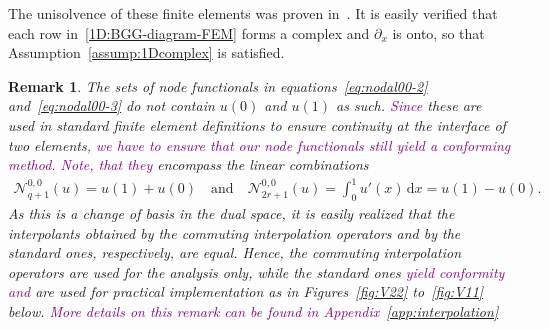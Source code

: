 \documentclass[final]{amsart}%
\newtheorem{remark}{Remark}
\newcommand{\0}{\mathaccent23}
\newcommand\dx{\,\mathrm{d}x}
\newcommand{\nodal}{\mathcal N}
\begin{document}
The unisolvence of these finite elements was proven in~\cite[Section 3.3]{Bonizzoni-Kanschat2022}.
It is easily verified that each row in~\eqref{1D:BGG-diagram-FEM} forms a complex and $\partial_x$ is onto, so that Assumption~\ref{assump:1Dcomplex} is satisfied.

\begin{remark}
\label{rem:change-of-basis}
    The sets of node functionals in equations~\eqref{eq:nodal00-2} and~\eqref{eq:nodal00-3} do not contain $u(0)$ and $u(1)$ as such.
    \textcolor{purple}{Since} these are used in standard finite element definitions to ensure continuity at the interface of two elements\textcolor{purple}{, we have to ensure that our node functionals still yield a conforming method. Note, that they} encompass the linear combinations
    \begin{gather}
    \label{eq:commuting-pair}
        \nodal^{0,0}_{q+1}(u) = u(1)+u(0)
        \quad\text{and}\quad
        \nodal^{0,0}_{2r+1}(u) = \int_0^1 u'(x) \dx = u(1)-u(0).
    \end{gather}
    As this is a change of basis in the dual space, it is easily realized that the interpolants obtained by the commuting interpolation operators and by the standard ones, respectively, are equal. Hence, the commuting interpolation operators are used for the analysis only, while the standard ones \textcolor{purple}{yield conformity and} are used for practical implementation as in Figures~\ref{fig:V22} to~\ref{fig:V11} below.
    \textcolor{purple}{ More details on this remark can be found in Appendix~\ref{app:interpolation}}
\end{remark}
\end{document}
